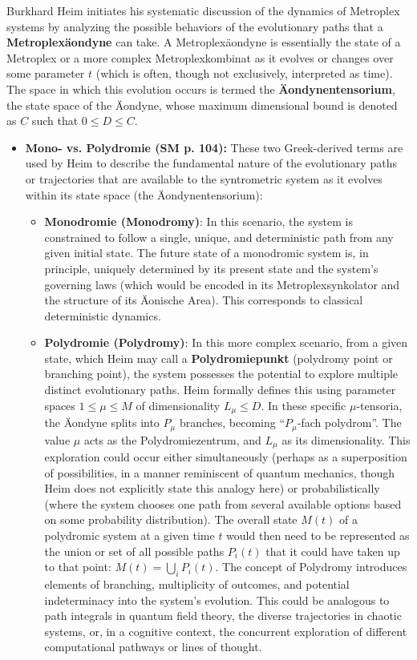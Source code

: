 \documentclass[12pt]{article}
\newcommand{\q}[1]{\enquote{#1}}
\begin{document}
Burkhard Heim initiates his systematic discussion of the dynamics of Metroplex systems by analyzing the possible behaviors of the evolutionary paths that a \textbf{Metroplexäondyne} can take. A Metroplexäondyne is essentially the state of a Metroplex or a more complex Metroplexkombinat as it evolves or changes over some parameter \( t \) (which is often, though not exclusively, interpreted as time). The space in which this evolution occurs is termed the \textbf{Äondynentensorium}, the state space of the Äondyne, whose maximum dimensional bound is denoted as \(C\) such that \(0 \le D \le C\).

\begin{itemize}
    \item \textbf{Mono- vs. Polydromie (SM p. 104):} These two Greek-derived terms are used by Heim to describe the fundamental nature of the evolutionary paths or trajectories that are available to the syntrometric system as it evolves within its state space (the Äondynentensorium):
    \begin{itemize}
        \item \textbf{Monodromie (Monodromy)}: In this scenario, the system is constrained to follow a single, unique, and deterministic path from any given initial state. The future state of a monodromic system is, in principle, uniquely determined by its present state and the system's governing laws (which would be encoded in its Metroplexsynkolator and the structure of its Äonische Area). This corresponds to classical deterministic dynamics.
        \item \textbf{Polydromie (Polydromy)}: In this more complex scenario, from a given state, which Heim may call a \textbf{Polydromiepunkt} (polydromy point or branching point), the system possesses the potential to explore multiple distinct evolutionary paths. Heim formally defines this using parameter spaces \(1 \le \mu \le M\) of dimensionality \(L_\mu \le D\). In these specific \( \mu \)-tensoria, the Äondyne splits into \( P_\mu \) branches, becoming \q{\( P_\mu \)-fach polydrom}. The value \(\mu\) acts as the Polydromiezentrum, and \(L_\mu\) as its dimensionality. This exploration could occur either simultaneously (perhaps as a superposition of possibilities, in a manner reminiscent of quantum mechanics, though Heim does not explicitly state this analogy here) or probabilistically (where the system chooses one path from several available options based on some probability distribution). The overall state \( M(t) \) of a polydromic system at a given time \( t \) would then need to be represented as the union or set of all possible paths \( P_i(t) \) that it could have taken up to that point: \( M(t) = \bigcup_i P_i(t) \). The concept of Polydromy introduces elements of branching, multiplicity of outcomes, and potential indeterminacy into the system's evolution. This could be analogous to path integrals in quantum field theory, the diverse trajectories in chaotic systems, or, in a cognitive context, the concurrent exploration of different computational pathways or lines of thought.
    \end{itemize}


\end{itemize}
\end{document}
